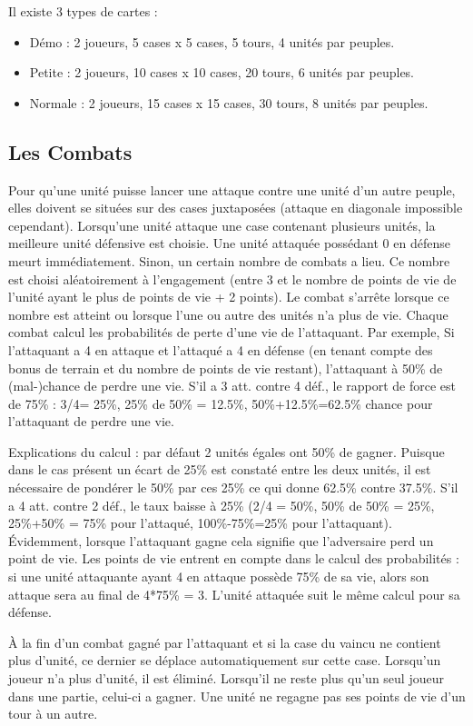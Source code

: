 \documentclass[a4paper]{article}%
\begin{document}
Il existe 3 types de cartes :
\begin{itemize}
\item Démo : 2 joueurs, 5 cases x 5 cases, 5 tours, 4 unités par peuples.
\item Petite : 2 joueurs, 10 cases x 10 cases, 20 tours, 6 unités par peuples.
\item Normale : 2 joueurs, 15 cases x 15 cases, 30 tours, 8 unités par peuples.
\end{itemize}

\subsection{Les Combats}
Pour qu’une unité puisse lancer une attaque contre une unité d’un autre peuple, elles doivent se situées sur des cases juxtaposées (attaque en diagonale impossible cependant). Lorsqu’une unité attaque une case contenant plusieurs unités, la meilleure unité défensive est choisie. Une unité attaquée possédant 0 en défense meurt immédiatement. Sinon, un certain nombre de combats a lieu. Ce nombre est choisi aléatoirement à l’engagement (entre 3 et le nombre de points de vie de l’unité ayant le plus de points de vie + 2 points). Le combat s’arrête lorsque ce nombre est atteint ou lorsque l’une ou autre des unités n’a plus de vie. Chaque combat calcul les probabilités de perte d’une vie de l’attaquant. Par exemple, Si l’attaquant a 4 en attaque et l’attaqué a 4 en défense (en tenant compte des bonus de terrain et du nombre de points de vie restant), l’attaquant à 50\% de (mal-)chance de perdre une vie. S’il a 3 att. contre 4 déf., le rapport de force est de 75\% : 3/4= 25\%, 25\% de 50\% = 12.5\%, 50\%+12.5\%=62.5\% chance pour l’attaquant de perdre une vie.

Explications du calcul : par défaut 2 unités égales ont 50\% de gagner. Puisque dans le cas présent un écart de 25\% est constaté entre les deux unités, il est nécessaire de pondérer le 50\% par ces 25\% ce qui donne 62.5\% contre 37.5\%. S’il a 4 att. contre 2 déf., le taux baisse à 25\% (2/4 = 50\%, 50\% de 50\% = 25\%, 25\%+50\% = 75\% pour l’attaqué, 100\%-75\%=25\% pour l’attaquant). Évidemment, lorsque l’attaquant gagne cela signifie que l’adversaire perd un point de vie. Les points de vie entrent en compte dans le calcul des probabilités : si une unité attaquante ayant 4 en attaque possède 75\% de sa vie, alors son attaque sera au final de 4*75\% = 3. L’unité attaquée suit le même calcul pour sa défense. 

À la fin d’un combat gagné par l’attaquant et si la case du vaincu ne contient plus d’unité, ce dernier se déplace automatiquement sur cette case. Lorsqu’un joueur n’a plus d’unité, il est éliminé. Lorsqu’il ne reste plus qu’un seul joueur dans une partie, celui-ci a gagner. Une unité ne regagne pas ses points de vie d’un tour à un autre.
\end{document}
